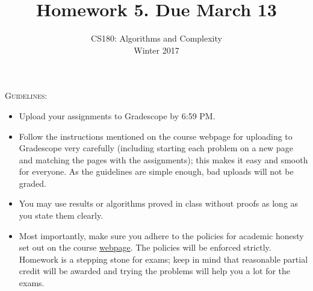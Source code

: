 \documentclass[11pt]{article}
\title{\bf{Homework 5. Due March 13}}
\author{ CS180: Algorithms and Complexity\\Winter 2017}
\date{}
\begin{document}
\maketitle
\begin{mdframed}
\textsc{Guidelines}:
\begin{itemize}
\item Upload your assignments to Gradescope by 6:59 PM. 
\item Follow the instructions mentioned on the course webpage for uploading to Gradescope very carefully (including starting each problem on a new page and matching the pages with the assignments); this makes it easy and smooth for everyone. As the guidelines are simple enough, bad uploads will not be graded. 
\item You may use results or algorithms proved in class without proofs as long as you state them clearly.
\item Most importantly, make sure you adhere to the policies for academic honesty set out on the course \href{http://cs180.raghumeka.org}{webpage}. The policies will be enforced strictly. Homework is a stepping stone for exams; keep in mind that reasonable partial credit will be awarded and trying the problems will help you a lot for the exams.
\end{itemize}
\end{mdframed}
\end{document}

